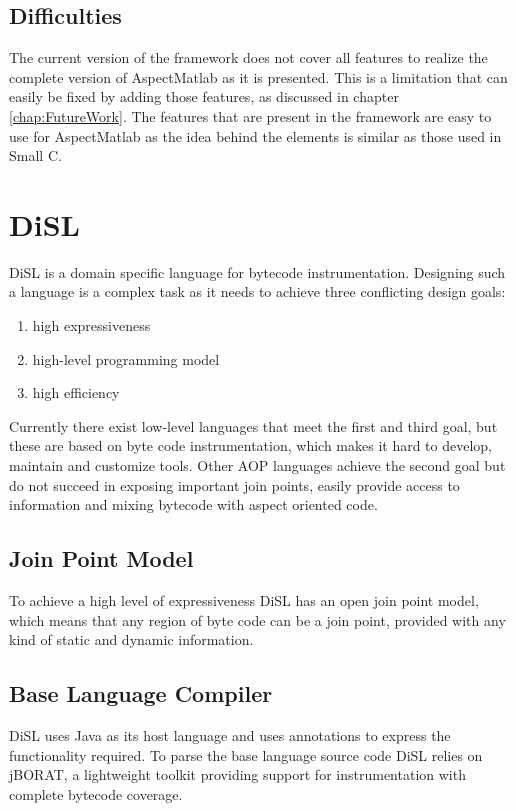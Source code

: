 \documentclass[a4paper]{report}
\begin{document}
\section{Difficulties}
The current version of the framework does not cover all features to realize the complete version of AspectMatlab as it is presented. This is a limitation that can easily be fixed by adding those features, as discussed in chapter \ref{chap:FutureWork}. The features that are present in the framework are easy to use for AspectMatlab as the idea behind the elements is similar as those used in Small C.

\chapter{DiSL}
DiSL \citep{marek_disl:_2012} is a domain specific language for bytecode instrumentation. Designing such a language is a complex task as it needs to achieve three conflicting design goals:
\begin{enumerate}
\item high expressiveness
\item high-level programming model
\item high efficiency
\end{enumerate}
Currently there exist low-level languages that meet the first and third goal, but these are based on byte code instrumentation, which makes it hard to develop, maintain and customize tools. Other AOP languages achieve the second goal but do not succeed in exposing important join points, easily provide access to information and mixing bytecode with aspect oriented code.

\section{Join Point Model}
To achieve a high level of expressiveness DiSL has an open join point model, which means that any region of byte code can be a join point, provided with any kind of static and dynamic information.

\section{Base Language Compiler}
DiSL uses Java as its host language and uses annotations to express the functionality required. To parse the base language source code DiSL relies on jBORAT, a lightweight toolkit providing support for instrumentation with complete bytecode coverage.
\end{document}

